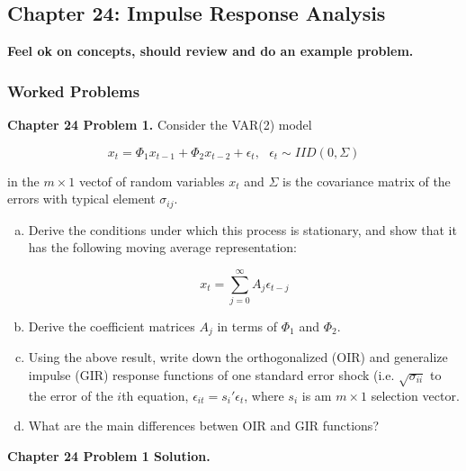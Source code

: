 %
%
%
%
%
%

\subsection{Chapter 24: Impulse Response Analysis}

\textbf{Feel ok on concepts, should review and do an example problem.}

\subsubsection{Worked Problems}


\textbf{Chapter 24 Problem 1.} Consider the VAR(2) model

\[
x_t = \Phi_1 x_{t-1} + \Phi_2 x_{t-2} + \epsilon_t, \ \ \ \epsilon_t \sim IID(0, \Sigma)
\]

in the \(m \times 1\) vectof of random variables \(x_t\) and \(\Sigma\) is the covariance matrix of the errors with typical element \(\sigma_{ij}\). 

\begin{enumerate}[(a)]

\item Derive the conditions under which this process is stationary, and show that it has the following moving average representation:

\begin{equation} \label{ts.ch24.p1.eq}
x_t = \sum_{j=0}^\infty A_j \epsilon_{t-j}
\end{equation}

\item Derive the coefficient matrices \(A_j\) in terms of \(\Phi_1\) and \(\Phi_2\).

\item Using the above result, write down the orthogonalized (OIR) and generalize impulse (GIR) response functions of one standard error shock (i.e. \(\sqrt{\sigma_{ii}}\) to the error of the \(i\)th equation, \(\epsilon_{it} = s_i' \epsilon_t\), where \(s_i\) is am \(m \times 1\) selection vector.

\item What are the main differences betwen OIR and GIR functions?

\end{enumerate}



\textbf{Chapter 24 Problem 1 Solution.}




